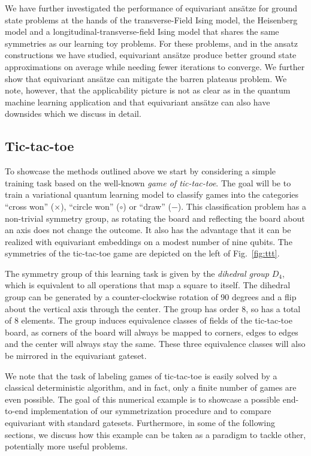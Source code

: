\documentclass[a4paper,twocolumn,notitlepage,nofootinbib,superscriptaddress,floatfix]{revtex4-2}
\begin{document}
We have further investigated the performance of equivariant ansätze for ground state problems at the hands of the transverse-Field Ising model, the Heisenberg model and a longitudinal-transverse-field Ising model that shares the same symmetries as our learning toy problems. For these problems, and in the ansatz constructions we have studied, equivariant ansätze produce better ground state approximations on average while needing fewer iterations to converge. We further show that equivariant ansätze can mitigate the barren plateaus problem. We note, however, that the applicability picture is not as clear as in the quantum machine learning application and that equivariant ansätze can also have downsides which we discuss in detail.

\subsection*{Tic-tac-toe}
To showcase the methods outlined above we start by considering a simple training task based on the well-known \emph{game of tic-tac-toe}. The goal will be to train a variational quantum learning model to classify games into the categories \enquote{cross won} ($\times$), \enquote{circle won} ($\circ$) or \enquote{draw} ($-$). This classification problem has a non-trivial symmetry group, as rotating the board and reflecting the board about an axis does not change the outcome. It also has the advantage that it can be realized with equivariant embeddings on a modest number of nine qubits. The symmetries of the tic-tac-toe game are depicted on the left of Fig.~\ref{fig:ttt}.

The symmetry group of this learning task is given by the \emph{dihedral group} $D_4$, which is equivalent to all operations that map a square to itself. The dihedral group can be generated by a counter-clockwise rotation of 90 degrees and a flip about the vertical axis through the center. The group has order $8$, so has a total of $8$ elements. The group induces equivalence classes of fields of the tic-tac-toe board, as corners of the board will always be mapped to corners, edges to edges and the center will always stay the same. These three equivalence classes will also be mirrored in the equivariant gateset. 

We note that the task of labeling games of tic-tac-toe is easily solved by a classical deterministic algorithm, and in fact, only a finite number of games are even possible. The goal of this numerical example is to showcase a possible end-to-end implementation of our symmetrization procedure and to compare equivariant with standard gatesets. Furthermore, in some of the following sections, we discuss how this example can be taken as a paradigm to tackle other, potentially more useful problems.
\end{document}
